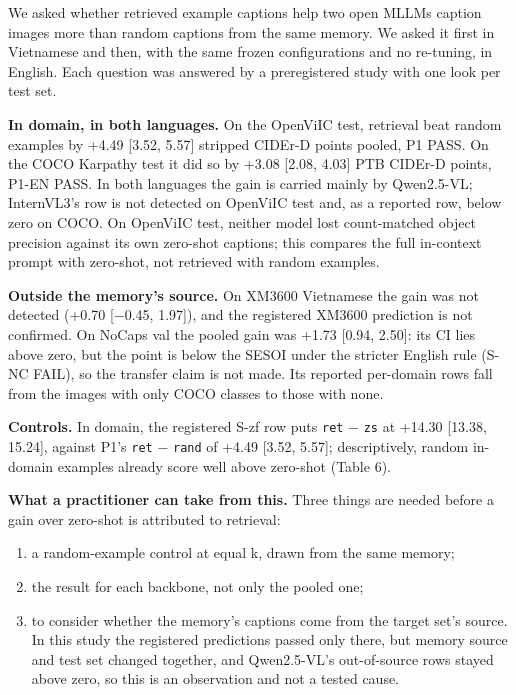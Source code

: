 We asked whether retrieved example captions help two open MLLMs caption images more than random
captions from the same memory. We asked it first in Vietnamese and then, with the same frozen
configurations and no re-tuning, in English. Each question was answered by a preregistered study
with one look per test set.

\textbf{In domain, in both languages.} On the OpenViIC test, retrieval beat random examples by +4.49
{[}3.52, 5.57{]} stripped CIDEr-D points pooled, P1 PASS. On the COCO Karpathy test it did so by
+3.08 {[}2.08, 4.03{]} PTB CIDEr-D points, P1-EN PASS. In both languages the gain is carried mainly
by Qwen2.5-VL; InternVL3's row is not detected on OpenViIC test and, as a reported row, below zero
on COCO. On OpenViIC test, neither model lost count-matched object precision against its own
zero-shot captions; this compares the full in-context prompt with zero-shot, not retrieved with
random examples.

\textbf{Outside the memory's source.} On XM3600 Vietnamese the gain was not detected (+0.70
{[}−0.45, 1.97{]}), and the registered XM3600 prediction is not confirmed. On NoCaps val the pooled
gain was +1.73 {[}0.94, 2.50{]}: its CI lies above zero, but the point is below the SESOI under the
stricter English rule (S-NC FAIL), so the transfer claim is not made. Its reported per-domain rows
fall from the images with only COCO classes to those with none.

\textbf{Controls.} In domain, the registered S-zf row puts \texttt{ret} − \texttt{zs} at +14.30
{[}13.38, 15.24{]}, against P1's \texttt{ret} − \texttt{rand} of +4.49 {[}3.52, 5.57{]};
descriptively, random in-domain examples already score well above zero-shot (Table 6).

\textbf{What a practitioner can take from this.} Three things are needed before a gain over
zero-shot is attributed to retrieval:

\begin{enumerate}
\def\labelenumi{\arabic{enumi}.}
\tightlist
\item
  a random-example control at equal k, drawn from the same memory;
\item
  the result for each backbone, not only the pooled one;
\item
  to consider whether the memory's captions come from the target set's source. In this study the
  registered predictions passed only there, but memory source and test set changed together, and
  Qwen2.5-VL's out-of-source rows stayed above zero, so this is an observation and not a tested
  cause.
\end{enumerate}

